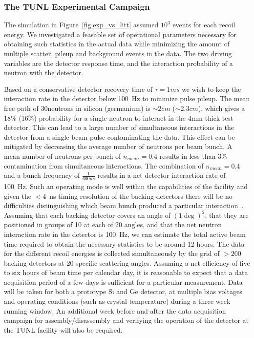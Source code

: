\subsubsection{The TUNL Experimental Campaign}

The simulation in Figure~\ref{fig:exp_vs_litt} assumed \(10^3\) events for each recoil energy. We investigated a feasable set of operational parameters necessary for obtaining such statistics in the actual data while minimizing the amount of multiple scatter, pileup and background events in the data. The two driving variables are the detector response time, and the interaction probability of a neutron with the detector. 

Based on a conservative detector recovery time of \(\tau=1ms\) we wish to keep the interaction rate in the detector below 100~Hz to minimize pulse pileup. The mean free path of 30\keV neutrons in silicon (germanium) is \(\sim 2cm\) (\(\sim 2.3cm\)), which gives a 18\% (16\%) probability for a single neutron to interact in the 4mm thick test detector. This can lead to a large number of simultaneous interactions in the detector from a single beam pulse contaminating the data. This effect can be mitigated by decreasing the average number of neutrons per beam bunch. A mean number of neutrons per bunch of \(n_{mean}=0.4\) results in less than 3\% contamination from simultaneous interactions. The combination of \(n_{mean}=0.4\) and a bunch frequency of \(\frac{1}{600\mu s}\) results in a net detector interaction rate of 100~Hz. Such an operating mode is well within the capabilities of the facility and given the $< 4$~ns timing resolution of the backing detectors there will be no difficulties distinguishing which beam bunch produced a particular interaction~\cite{barbeau:2014}. Assuming that each backing detector covers an angle of \(\left( 1\deg\right)^2\), that they are positioned in groups of 10 at each of 20 angles, and that the net neutron interaction rate in the detector is 100~Hz, we can estimate the total active beam time required to obtain the necessary statistics to be around 12 hours. The data for the different recoil energies is collected simultaneously by the grid of \(>200\) backing detectors at 20 specific scattering angles. Assuming a net efficiency of five to six hours of beam time per calendar day, it is reasonable to expect that a data acquisition period of a few days is sufficient for a particular measurement. Data will be taken for both a prototype Si and Ge detector, at multiple bias voltages and operating conditions (such as crystal temperature) during a three week running window. An additional week before and after the data acquisition campaign for assembly/disassembly and verifying the operation of the detector at the TUNL facility will also be required.

